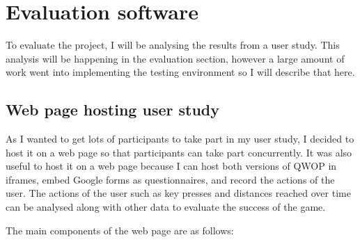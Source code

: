 \documentclass[12pt,a4paper,twoside,openright]{report}
\begin{document}
\section{Evaluation software}
\label{sec:evalSoftware}
To evaluate the project, I will be analysing the results from a user study. This analysis will be happening in the evaluation section, however a large amount of work went into implementing the testing environment so I will describe that here.

\newcommand{\userStudySections}{
	\begin{enumerate}
		\item A html page that guides the participant through the sections of the study
		\item An embedded Google form that finds out demographics and the previous experience of each participant.
		\item An A/B test. Each participant is randomly placed into one of the two groups, each of which play the two versions of QWOP in a different order. Each game is played for 5 minutes before the page moves onto the next section. While each game is played, the key presses and distances reached for each participant are recorded. The benefit of doing a randomised control trial is that selection bias is minimised. The splitting of participants into two groups means that the effect of playing one game before the other can be taken into consideration and not affect the analysis.
		\item A final questionnaire that gives feedback on the two versions
	\end{enumerate}
}


	\subsection{Web page hosting user study}
	\label{sec:webPage}


	As I wanted to get lots of participants to take part in my user study, I decided to host it on a web page so that participants can take part concurrently. It was also useful to host it on a web page because I can host both versions of QWOP in iframes, embed Google forms as questionnaires, and record the actions of the user. The actions of the user such as key presses and distances reached over time can be analysed along with other data to evaluate the success of the game.

	The main components of the web page are as follows:
\end{document}
